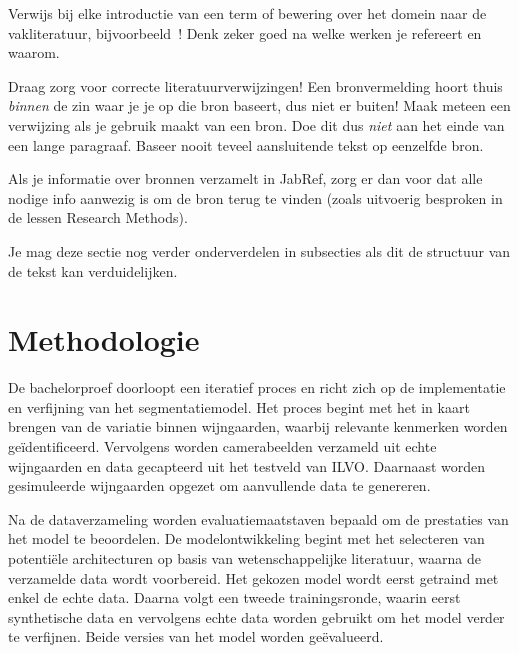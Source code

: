 Verwijs bij elke introductie van een term of bewering over het domein naar de vakliteratuur, bijvoorbeeld~\autocite{Hykes2013}! Denk zeker goed na welke werken je refereert en waarom.

Draag zorg voor correcte literatuurverwijzingen! Een bronvermelding hoort thuis \emph{binnen} de zin waar je je op die bron baseert, dus niet er buiten! Maak meteen een verwijzing als je gebruik maakt van een bron. Doe dit dus \emph{niet} aan het einde van een lange paragraaf. Baseer nooit teveel aansluitende tekst op eenzelfde bron.

Als je informatie over bronnen verzamelt in JabRef, zorg er dan voor dat alle nodige info aanwezig is om de bron terug te vinden (zoals uitvoerig besproken in de lessen Research Methods).


Je mag deze sectie nog verder onderverdelen in subsecties als dit de structuur van de tekst kan verduidelijken.

\section{Methodologie}%
\label{sec:methodologie}

De bachelorproef doorloopt een iteratief proces en richt zich op de implementatie en verfijning van het segmentatiemodel. Het proces begint met het in kaart brengen van de variatie binnen wijngaarden, waarbij relevante kenmerken worden geïdentificeerd. Vervolgens worden camerabeelden verzameld uit echte wijngaarden en data gecapteerd uit het testveld van ILVO. Daarnaast worden gesimuleerde wijngaarden opgezet om aanvullende data te genereren.

Na de dataverzameling worden evaluatiemaatstaven bepaald om de prestaties van het model te beoordelen. De modelontwikkeling begint met het selecteren van potentiële architecturen op basis van wetenschappelijke literatuur, waarna de verzamelde data wordt voorbereid. Het gekozen model wordt eerst getraind met enkel de echte data. Daarna volgt een tweede trainingsronde, waarin eerst synthetische data en vervolgens echte data worden gebruikt om het model verder te verfijnen. Beide versies van het model worden geëvalueerd.

